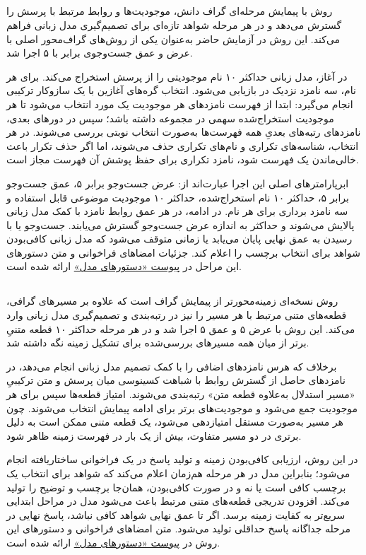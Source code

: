 \subsection{}

روش  با پیمایش مرحله‌ای گراف دانش، موجودیت‌ها و روابط مرتبط با پرسش را گسترش می‌دهد و در هر مرحله شواهد تازه‌ای برای تصمیم‌گیری مدل زبانی فراهم می‌کند. این روش در آزمایش حاضر به‌عنوان یکی از روش‌های گراف‌محور اصلی با عرض و عمق جست‌وجوی برابر با ۵ اجرا شد.

در آغاز، مدل زبانی حداکثر ۱۰ نام موجودیتی را از پرسش استخراج می‌کند. برای هر نام، سه نامزد نزدیک در  بازیابی می‌شود. انتخاب گره‌های آغازین با یک سازوکار ترکیبی انجام می‌گیرد: ابتدا از فهرست نامزدهای هر موجودیت یک مورد انتخاب می‌شود تا هر موجودیت استخراج‌شده سهمی در مجموعه داشته باشد؛ سپس در دورهای بعدی، نامزدهای رتبه‌های بعدیِ همه فهرست‌ها به‌صورت انتخاب نوبتی بررسی می‌شوند. در هر انتخاب، شناسه‌های تکراری و نام‌های تکراری حذف می‌شوند، اما اگر حذف تکرار باعث خالی‌ماندن یک فهرست شود، نامزد تکراری برای حفظ پوشش آن فهرست مجاز است.

ابرپارامترهای اصلی این اجرا عبارت‌اند از: عرض جست‌وجو برابر ۵، عمق جست‌وجو برابر ۵، حداکثر ۱۰ نام استخراج‌شده، حداکثر ۱۰ موجودیت موضوعی قابل استفاده و سه نامزد برداری برای هر نام. در ادامه، در هر عمق روابط نامزد با کمک مدل زبانی پالایش می‌شوند و حداکثر به اندازه عرض جست‌وجو گسترش می‌یابند. جست‌وجو یا با رسیدن به عمق نهایی پایان می‌یابد یا زمانی متوقف می‌شود که مدل زبانی کافی‌بودن شواهد برای انتخاب برچسب را اعلام کند. جزئیات امضاهای فراخوانی و متن دستورهای این مراحل در \hyperref[app:prompts]{پیوست «دستورهای مدل»} ارائه شده است.

\subsection{}

روش  نسخه‌ای زمینه‌محورتر از پیمایش گراف است که علاوه بر مسیرهای گرافی، قطعه‌های متنی مرتبط با هر مسیر را نیز در رتبه‌بندی و تصمیم‌گیری مدل زبانی وارد می‌کند. این روش با عرض ۵ و عمق ۵ اجرا شد و در هر مرحله حداکثر ۱۰ قطعه متنیِ برتر از میان همه مسیرهای بررسی‌شده برای تشکیل زمینه نگه داشته شد.

برخلاف  که هرس نامزدهای اضافی را با کمک تصمیم مدل زبانی انجام می‌دهد، در  نامزدهای حاصل از گسترش روابط با شباهت کسینوسی میان پرسش و متن ترکیبیِ «مسیر استدلال به‌علاوه قطعه متن» رتبه‌بندی می‌شوند. امتیاز قطعه‌ها سپس برای هر موجودیت جمع می‌شود و موجودیت‌های برتر برای ادامه پیمایش انتخاب می‌شوند. چون هر مسیر به‌صورت مستقل امتیازدهی می‌شود، یک قطعه متنی ممکن است به دلیل برتری در دو مسیر متفاوت، بیش از یک بار در فهرست زمینه ظاهر شود.

در این روش، ارزیابی کافی‌بودن زمینه و تولید پاسخ در یک فراخوانی ساختاریافته انجام می‌شود؛ بنابراین مدل در هر مرحله هم‌زمان اعلام می‌کند که شواهد برای انتخاب یک برچسب کافی است یا نه و در صورت کافی‌بودن، همان‌جا برچسب و توضیح را تولید می‌کند. افزودن تدریجی قطعه‌های متنی مرتبط باعث می‌شود مدل در مراحل ابتدایی سریع‌تر به کفایت زمینه برسد. اگر تا عمق نهایی شواهد کافی نباشد، پاسخ نهایی در مرحله جداگانه پاسخ حداقلی تولید می‌شود. متن امضاهای فراخوانی و دستورهای این روش در \hyperref[app:prompts]{پیوست «دستورهای مدل»} ارائه شده است.
